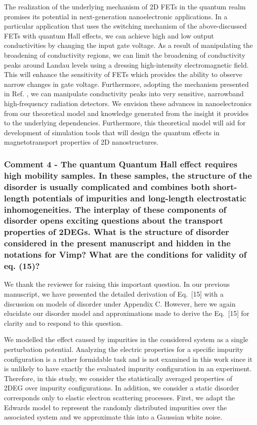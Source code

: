 \documentclass{article}
\begin{document}
\begin{itemize}
{  The realization of the underlying mechanism of 2D FETs in the quantum realm promises its potential in next-generation nanoelectronic applications. In a particular application that uses the switching mechanism of the above-discussed FETs with quantum Hall effects, we can achieve high and low output conductivities by changing the input gate voltage. As a result of manipulating the broadening of conductivity regions, we can limit the broadening of conductivity peaks around Landau levels using a dressing high-intensity electromagnetic field. This will enhance the sensitivity of FETs which provides the ability to observe narrow changes in gate voltage.
  Furthermore, adopting the mechanism presented in Ref. \cite{hirakawa01}, we can manipulate conductivity peaks into very sensitive, narrowband high-frequency radiation detectors.
  We envision these advances in nanoelectronics from our theoretical model and knowledge generated from the insight it provides to the underlying dependencies.
  Furthermore, this theoretical model will aid for development of simulation tools that will design the quantum effects in magnetotransport properties of 2D nanostructures.
  }
\end{itemize}

\subsubsection*{Comment 4 -
\color{RoyalBlue} The quantum Quantum Hall effect requires high mobility samples. In these samples, the structure of the disorder is usually complicated and combines both short-length potentials of impurities and long-length electrostatic inhomogeneities. The interplay of these components of disorder opens exciting questions about the transport properties of 2DEGs. What is the structure of disorder considered in the present manuscript and hidden in the notations for Vimp? What are the conditions for validity of eq. (15)?
}

We thank the reviewer for raising this important question. In our previous manuscript, we have presented the detailed derivation of Eq.~[15] with a discussion on models of disorder under Appendix C. However, here we again elucidate our disorder model and approximations made to derive the Eq.~[15] for clarity and to respond to this question.

We modelled the effect caused by impurities in the considered system as a single perturbation potential. Analyzing the electric properties for a specific impurity configuration is a rather formidable task and is not examined in this work since it is unlikely to have exactly the evaluated impurity configuration in an experiment. Therefore, in this study, we consider the statistically averaged properties of 2DEG over impurity configurations.
In addition, we consider a static disorder corresponds only to elastic electron scattering processes.
First, we adapt the Edwards model \cite{akkermans10} to represent the randomly distributed impurities over the associated system and we approximate this into a Gaussian white noise.
\end{document}
